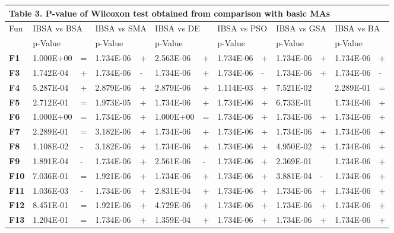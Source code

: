 \documentclass{article} %
\begin{document}
\begin{tabular}{|p{0.3in}|p{0.7in}|p{0.2in}|p{0.7in}|p{0.2in}|p{0.7in}|p{0.2in}|p{0.5in}|p{0.2in}|p{0.5in}|p{0.2in}|p{0.6in}|p{0.2in}|} \hline 
\multicolumn{13}{|p{5.3in}|}{\textbf{Table }3\textbf{. }P-value of Wilcoxon test obtained from comparison with basic MAs} \\ \hline 
Fun & \multicolumn{2}{|p{0.9in}|}{IBSA vs BSA} & \multicolumn{2}{|p{0.9in}|}{IBSA vs SMA} & \multicolumn{2}{|p{0.9in}|}{IBSA vs DE} & \multicolumn{2}{|p{0.8in}|}{IBSA vs PSO} & \multicolumn{2}{|p{0.8in}|}{IBSA vs GSA} & \multicolumn{2}{|p{0.9in}|}{IBSA vs BA} \\ \hline 
 & p-Value &  & p-Value &  & p-Value &  & p-Value &  & p-Value &  & p-Value &  \\ \hline 
\textbf{F1} & 1.000E+00 & = & 1.734E-06 & + & 2.563E-06 & + & 1.734E-06 & + & 1.734E-06 & + & 1.734E-06 & + \\ \hline 
\textbf{F3} & 1.742E-04 & + & 1.734E-06 & - & 1.734E-06 & + & 1.734E-06 & - & 1.734E-06 & + & 1.734E-06 & - \\ \hline 
\textbf{F4} & 5.287E-04 & + & 2.879E-06 & + & 2.879E-06 & + & 1.114E-03 & + & 7.521E-02 &   & 2.289E-01 &  = \\ \hline 
\textbf{F5} & 2.712E-01 & = & 1.973E-05 & + & 1.734E-06 & + & 1.734E-06 & + & 6.733E-01 &   & 1.734E-06 & + \\ \hline 
\textbf{F6} & 1.000E+00 & = & 1.734E-06 & + & 1.000E+00 &  = & 1.734E-06 & + & 1.734E-06 & + & 1.734E-06 & + \\ \hline 
\textbf{F7} & 2.289E-01 & = & 3.182E-06 & + & 1.734E-06 & + & 1.734E-06 & + & 1.734E-06 & + & 1.734E-06 & + \\ \hline 
\textbf{F8} & 1.108E-02 & - & 3.182E-06 & + & 1.734E-06 & + & 1.734E-06 & + & 4.950E-02 & + & 1.734E-06 & + \\ \hline 
\textbf{F9} & 1.891E-04 & - & 1.734E-06 & + & 2.561E-06 & - & 1.734E-06 & + & 2.369E-01 &   & 1.734E-06 & + \\ \hline 
\textbf{F10} & 7.036E-01 & = & 1.921E-06 & + & 1.734E-06 & + & 1.734E-06 & + & 3.881E-04 & - & 1.734E-06 & + \\ \hline 
\textbf{F11} & 1.036E-03 & - & 1.734E-06 & + & 2.831E-04 & + & 1.734E-06 & + & 1.734E-06 & + & 1.734E-06 & + \\ \hline 
\textbf{F12} & 8.451E-01 & = & 1.921E-06 & + & 4.729E-06 & + & 1.734E-06 & + & 1.734E-06 & + & 1.734E-06 & + \\ \hline 
\textbf{F13} & 1.204E-01 & = & 1.734E-06 & + & 1.359E-04 & + & 1.734E-06 & + & 1.734E-06 & + & 1.734E-06 & + \\ \hline 

\end{tabular}
\end{document}
